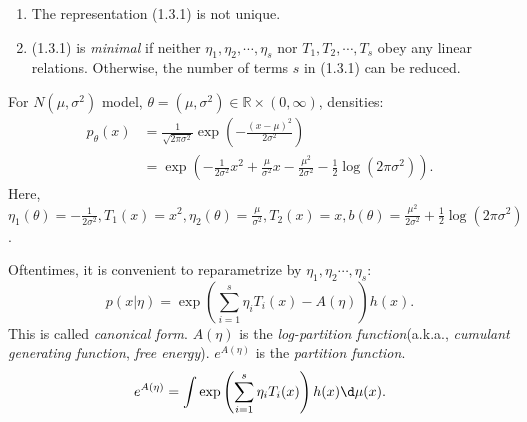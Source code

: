 \documentclass[a4paper]{article}
\begin{document}
\newpage
\begin{remark}
	\quad
	\begin{enumerate}
		\item The representation (1.3.1) is not unique.
		\item (1.3.1) is \emph{minimal} if neither ${\eta}_1, \eta_2, \cdots, {\eta}_s$ nor $T_1, T_2, \cdots, T_s$ obey any linear relations. Otherwise, the number of terms $s$ in (1.3.1) can be reduced.
	\end{enumerate}
\end{remark}

\begin{eg}
	For $N(\mu, {\sigma}^2)$ model, $\theta = (\mu, {\sigma}^2) \in \mathbb{R} \times (0, \infty)$, densities:
	\begin{equation*}
		\begin{aligned}
			p_{\theta} (x) &= \frac{1}{\sqrt{2 \pi {\sigma}^2}} \exp \left(- \frac{(x - \mu)^2}{2 {\sigma}^2}\right) \\
			&= \exp\left(-\frac{1}{2{\sigma}^2} x^2 + \frac{\mu}{{\sigma}^2}x - \frac{{\mu}^2}{2 {\sigma}^2} - \frac{1}{2} \log (2 \pi {\sigma}^2)\right).
		\end{aligned}
	\end{equation*}
	Here, $\eta_1 (\theta) = -\frac{1}{2{\sigma}^2}, T_1(x) = x^2, \eta_2 (\theta) = \frac{\mu}{{\sigma}^2}, T_2(x) = x, b(\theta) =  \frac{{\mu}^2}{2 {\sigma}^2} + \frac{1}{2} \log (2 \pi {\sigma}^2)$.
\end{eg}

\noindent Oftentimes, it is convenient to reparametrize by $\eta_1, \eta_2 \cdots, \eta_s$:
\begin{equation}
	p(x|\eta) = \exp \left(\sum\limits_{i = 1}^s \eta_i T_i (x) - A(\eta)\right)h(x).
\end{equation}
This is called \emph{canonical form}. $A(\eta)$ is the \emph{log-partition function}(a.k.a., \emph{cumulant generating function}, \emph{free energy}). $e^{A(\eta)}$ is the \emph{partition function}.
\begin{equation}
	e^{A(\eta)} = \int \exp\left(\sum\limits_{i = 1}^s \eta_i T_i (x)\right)h(x) \d \mu (x).
\end{equation}
\end{document}
